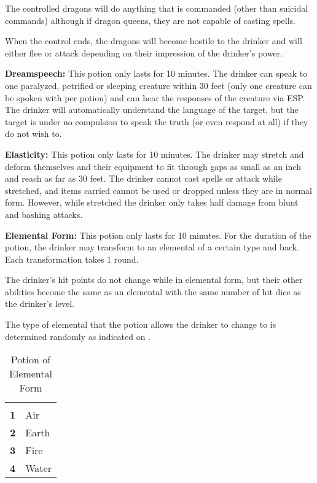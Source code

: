 \begin{multicols*}{2}
The controlled dragons will do anything that is commanded (other than suicidal commands) although if dragon queens, they are not capable of casting spells.

When the control ends, the dragons will become hostile to the drinker and will either flee or attack depending on their impression of the drinker’s power.

\textbf{Dreamspeech:} This potion only lasts for 10 minutes. The drinker can speak to one paralyzed, petrified or sleeping creature within 30 feet (only one creature can be spoken with per potion) and can hear the responses of the creature via ESP. The drinker will automatically understand the language of the target, but the target is under no compulsion to speak the truth (or even respond at all) if they do not wish to.

\textbf{Elasticity:} This potion only lasts for 10 minutes. The drinker may stretch and deform themselves and their equipment to fit through gaps as small as an inch and reach as far as 30 feet. The drinker cannot cast spells or attack while stretched, and items carried cannot be used or dropped unless they are in normal form. However, while stretched the drinker only takes half damage from blunt and bashing attacks.

\textbf{Elemental Form:} This potion only lasts for 10 minutes. For the duration of the potion, the drinker may transform to an elemental of a certain type and back. Each transformation takes 1 round.

The drinker’s hit points do not change while in elemental form, but their other abilities become the same as an elemental with the same number of hit dice as the drinker’s level.

The type of elemental that the potion allows the drinker to change to is determined randomly as indicated on .

\begin {table}[H]
  \caption{Potion of Elemental Form}\label{tab:Potion of Elemental Form}
  \begin{tabularx}{\columnwidth}{>{\bfseries}YY}
	 & \\
	1 & Air\\
	2 & Earth\\
	3 & Fire\\
	4 & Water
  \end {tabularx}
\end {table}


\end{multicols*}
